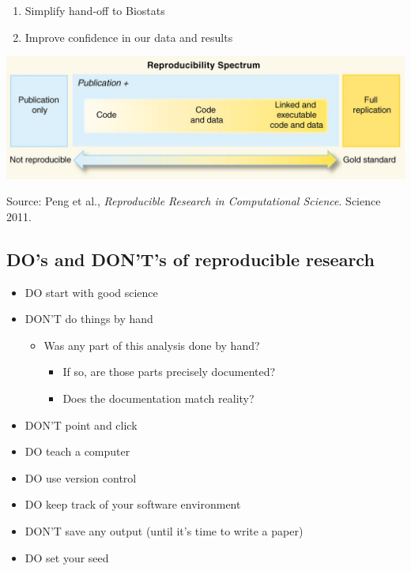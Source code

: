 \documentclass[openany]{book}
\providecommand{\tightlist}{%
  \setlength{\itemsep}{0pt}\setlength{\parskip}{0pt}}
\begin{document}
\begin{enumerate}
\def\labelenumi{\arabic{enumi}.}
\setcounter{enumi}{1}
\item
  Simplify hand-off to Biostats
\item
  Improve confidence in our data and results
\end{enumerate}

\includegraphics{images/reprodresearch.jpg}

Source: Peng et al., \emph{Reproducible Research in Computational Science}. Science 2011.

\hypertarget{dos-and-donts-of-reproducible-research}{%
\subsection{DO's and DON'T's of reproducible research}\label{dos-and-donts-of-reproducible-research}}

\begin{itemize}
\tightlist
\item
  DO start with good science
\item
  DON'T do things by hand

  \begin{itemize}
  \tightlist
  \item
    Was any part of this analysis done by hand?

    \begin{itemize}
    \tightlist
    \item
      If so, are those parts precisely documented?
    \item
      Does the documentation match reality?
    \end{itemize}
  \end{itemize}
\item
  DON'T point and click
\item
  DO teach a computer
\item
  DO use version control
\item
  DO keep track of your software environment
\item
  DON'T save any output (until it's time to write a paper)
\item
  DO set your seed
\end{itemize}
\end{document}
